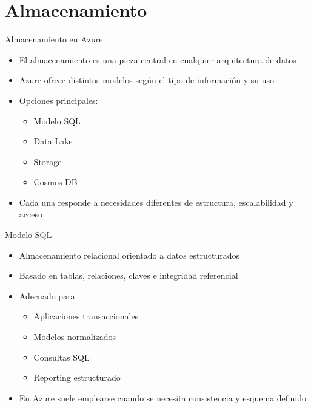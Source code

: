 \documentclass{beamer}
\begin{document}
\section{Almacenamiento}

\begin{frame}{Almacenamiento en Azure}
\begin{itemize}
    \item El almacenamiento es una pieza central en cualquier arquitectura de datos
    \item Azure ofrece distintos modelos según el tipo de información y su uso
    \item Opciones principales:
    \begin{itemize}
        \item Modelo SQL
        \item Data Lake
        \item Storage
        \item Cosmos DB
    \end{itemize}
    \item Cada una responde a necesidades diferentes de estructura, escalabilidad y acceso
\end{itemize}
\end{frame}

\begin{frame}{Modelo SQL}
\begin{itemize}
    \item Almacenamiento relacional orientado a datos estructurados
    \item Basado en tablas, relaciones, claves e integridad referencial
    \item Adecuado para:
    \begin{itemize}
        \item Aplicaciones transaccionales
        \item Modelos normalizados
        \item Consultas SQL
        \item Reporting estructurado
    \end{itemize}
    \item En Azure suele emplearse cuando se necesita consistencia y esquema definido
\end{itemize}
\end{frame}
\end{document}
